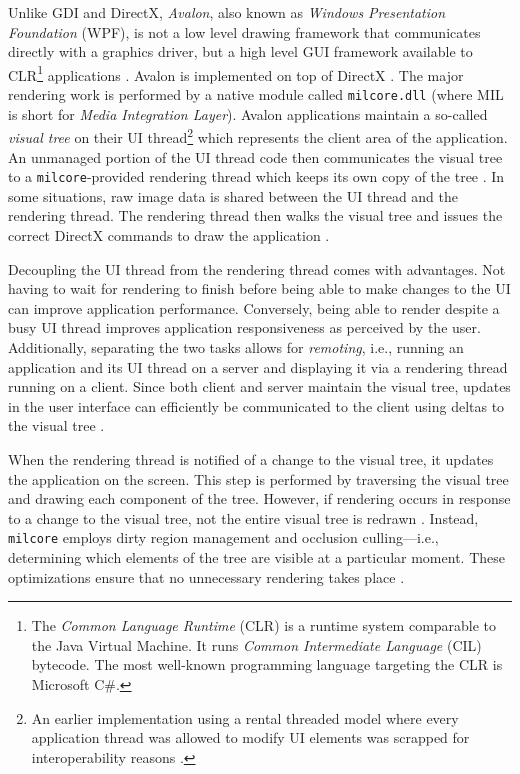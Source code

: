 		\label{sec:milcore}
			Unlike GDI and DirectX, \textit{Avalon}, also known as \textit{Windows Presentation
			Foundation} (WPF),
			is not a low level drawing framework
			that communicates directly with a graphics driver, but a
			high level GUI framework available to CLR\footnote{The \textit{Common
			Language Runtime} (CLR) is a runtime system comparable to the Java Virtual
			Machine. It runs \textit{Common Intermediate Language} (CIL) bytecode.
			The most well-known programming language targeting the CLR is Microsoft
			C\#.} applications \cite{goingdeep}. Avalon is
			implemented on top of DirectX \cite{dwmwpf}. The major rendering work is performed
			by a native module called \texttt{milcore.dll} (where MIL is short for
			\textit{Media Integration Layer}). Avalon applications maintain a
			so-called \textit{visual tree} on their UI thread\footnote{An
			earlier implementation using a rental threaded model where every
			application thread was allowed to modify UI elements was scrapped
			for interoperability reasons \cite{goingdeep}.} which represents the
			client area of the application. An unmanaged portion of the UI thread
			code then communicates the visual tree to a \texttt{milcore}-provided
			rendering thread which keeps its own copy of the tree \cite{goingdeep}. In some situations,
			raw image data is shared between the UI thread and the rendering thread. The
			rendering thread then walks the visual tree and issues the correct
			DirectX commands to draw the application \cite{goingdeep}.

			Decoupling the UI thread from the rendering thread comes with
			advantages. Not having to wait for rendering to finish before being
			able to make changes to the UI can improve application performance.
			Conversely, being able to render despite a busy UI thread improves
			application responsiveness as perceived by the user. Additionally,
			separating the two tasks allows for \textit{remoting}, i.e., running
			an application and its UI thread on a server and displaying it
			via a rendering thread running on a client. Since both client and
			server maintain the visual tree, updates in the user interface can
			efficiently be communicated to the client using deltas to the visual
			tree \cite{goingdeep}.

			When the rendering thread is notified of a change to the visual tree,
			it updates the application on the screen. This step is performed by
			traversing the visual tree and drawing each component of the tree.
			However, if rendering occurs in response to a change to the visual
			tree, not the entire visual tree is redrawn \cite{goingdeep}. Instead, \texttt{milcore}
			employs dirty region management and occlusion culling---i.e.,
			determining which elements of the tree are visible at a particular
			moment. These optimizations ensure that no unnecessary rendering takes
			place \cite{goingdeep}.

